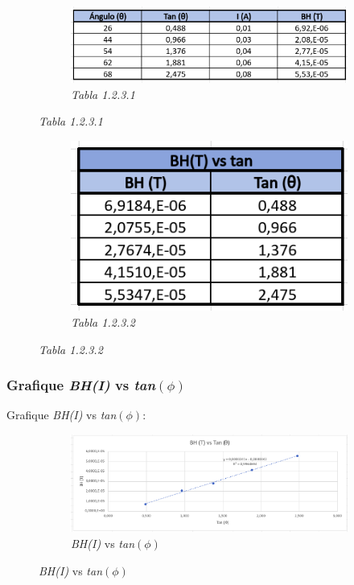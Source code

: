 \begin{figure}[H]
    \centering
    \begin{subfigure}[b]{\textwidth}
        \centering
        \includegraphics[width=\textwidth]{Figures/0. General/2.3.1.png}
        \caption{\textit{Tabla 1.2.3.1}}
    \end{subfigure}
\end{figure}

\begin{figure}[H]
    \centering
    \begin{subfigure}[b]{0.6\textwidth}
        \centering
        \includegraphics[width=\textwidth]{Figures/0. General/2.3.2.png}
        \caption{\textit{Tabla 1.2.3.2}}
    \end{subfigure}
\end{figure}



\subsubsection{Grafique \textit{BH(I)} vs \textit{tan\((\phi)\)}}
Grafique \textit{BH(I)} vs \textit{tan\((\phi)\)}:

\begin{figure}[H]
    \centering
    \begin{subfigure}[b]{\textwidth}
        \centering
        \includegraphics[width=\textwidth]{Figures/0. General/2.4.png}
        \caption{\textit{BH(I)} vs \textit{tan\((\phi)\)}}
    \end{subfigure}
\end{figure}


